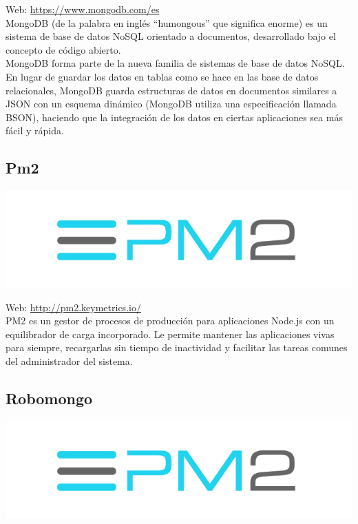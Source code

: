 Web: \url{https://www.mongodb.com/es}\\

MongoDB (de la palabra en inglés “humongous” que significa enorme) es un sistema de base de datos NoSQL orientado a documentos, desarrollado bajo el concepto de código abierto.\\

MongoDB forma parte de la nueva familia de sistemas de base de datos NoSQL. En lugar de guardar los datos en tablas como se hace en las base de datos relacionales, MongoDB guarda estructuras de datos en documentos similares a JSON con un esquema dinámico (MongoDB utiliza una especificación llamada BSON), haciendo que la integración de los datos en ciertas aplicaciones sea más fácil y rápida.\\



\subsection{Pm2}

\begin{center}
\includegraphics[scale=0.5]{imagenes/pm2-logo.png}
\end{center}

Web: \url{http://pm2.keymetrics.io/}\\


PM2 es un gestor de procesos de producción para aplicaciones Node.js con un equilibrador de carga incorporado. Le permite mantener las aplicaciones vivas para siempre, recargarlas sin tiempo de inactividad
y facilitar las tareas comunes del administrador del sistema.


\subsection{ Robomongo }

\begin{center}
\includegraphics[scale=0.5]{imagenes/pm2-logo.png}
\end{center}







